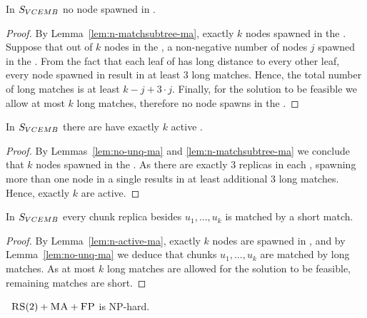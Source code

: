 \begin{lemma}
  In $S_{VCEMB}$ no node spawned in \UnqGadget{}.
  \label{lem:no-unq-ma}
\end{lemma}
\begin{proof}
  By Lemma~\ref{lem:n-matchsubtree-ma}, exactly $k$ nodes spawned in the \MatchSubtree{}.
Suppose that out of $k$ nodes in the \MatchSubtree{}, a non-negative number of nodes $j$ spawned in the \UnqGadgets{}.
From the fact that each leaf of \UnqGadget{} has long distance to every other leaf, every node spawned in \UnqGadget{} result in at least $3$ long matches.
Hence, the total number of long matches is at least $k-j + 3\cdot j$.
Finally, for the solution to be feasible we allow at most $k$ long matches, therefore no node spawns in the \UnqGadget{}.
\end{proof}

\begin{lemma}
  In $S_{VCEMB}$ there are have exactly $k$ active \TripleGadgets{}.
  \label{lem:n-active-ma}
\end{lemma}
\begin{proof}
  By Lemmas~\ref{lem:no-unq-ma} and \ref{lem:n-matchsubtree-ma} we conclude that $k$ nodes spawned in the \TripleGadgets.
As there are exactly $3$ replicas in each \TripleGadget{}, spawning more than one node in a single \TripleGadget{} results in at least additional $3$ long matches.
Hence, exactly $k$ \TripleGadgets{} are active.
\end{proof}

\begin{lemma}
  In $S_{VCEMB}$ every chunk replica besides $u_1, \ldots, u_k$ is matched by a short match.
  \label{lem:short-ma}
\end{lemma}
\begin{proof}
  By Lemma~\ref{lem:n-active-ma}, exactly $k$ nodes are spawned in \TripleGadgets{}, and by Lemma~\ref{lem:no-unq-ma} we deduce that chunks $u_1, \ldots, u_k$ are matched by long matches.
  As at most $k$ long matches are allowed for the solution to be feasible, remaining matches are short.
\end{proof}

\begin{theorem}
  ~$\textsc{RS}(2)+\textsc{MA}+\textsc{FP}$ is NP-hard.
  \label{th:ma-reduction}
\end{theorem}

